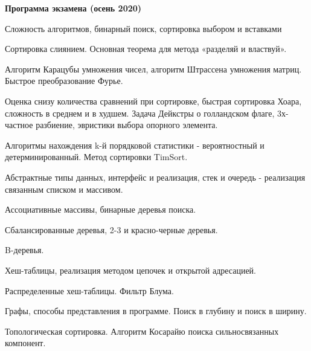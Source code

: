 \documentclass[specialist, subf, href, colorlinks=true, 12pt, times, mtpro, final]{disser}
\begin{document}
\tableofcontents

\newpage
{\Large \bf Программа экзамена (осень 2020)}

\begin{enumerate}
{\small
\item Сложность алгоритмов, бинарный поиск, сортировка выбором и вставками
\item Сортировка слиянием. Основная теорема для метода «разделяй и властвуй».
\item Алгоритм Карацубы умножения чисел, алгоритм Штрассена умножения матриц. Быстрое преобразование Фурье.
\item Оценка снизу количества сравнений при сортировке, быстрая сортировка Хоара, сложность в среднем и в худшем. Задача Дейкстры о голландском флаге, 3х-частное разбиение, эвристики выбора опорного элемента.
\item Алгоритмы нахождения k-й порядковой статистики - вероятностный и детерминированный. Метод сортировки TimSort.
\item Абстрактные типы данных, интерфейс и реализация, стек и очередь - реализация связанным списком и массивом.
\item Ассоциативные массивы, бинарные деревья поиска.
\item Сбалансированные деревья, 2-3 и красно-черные деревья.
\item B-деревья.
\item Хеш-таблицы, реализация методом цепочек и открытой адресацией.
\item Распределенные хеш-таблицы. Фильтр Блума.
\item Графы, способы представления в программе. Поиск в глубину и поиск в ширину.
\item Топологическая сортировка. Алгоритм Косарайю поиска сильносвязанных компонент.
}
\end{enumerate}
\end{document}
